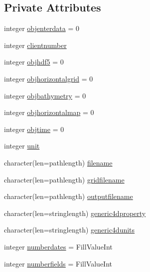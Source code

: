 \subsection*{Private Attributes}
\begin{DoxyCompactItemize}
\item 
integer \mbox{\hyperlink{structmoduleswan_1_1t__swan_ab28b32c787ffbe105db90cca3d7f8b81}{objenterdata}} = 0
\item 
integer \mbox{\hyperlink{structmoduleswan_1_1t__swan_aa430fc89c288d1393c57c9ebd5ec7ba4}{clientnumber}}
\item 
integer \mbox{\hyperlink{structmoduleswan_1_1t__swan_a33924ccabc1d330c49f9f284c1142565}{objhdf5}} = 0
\item 
integer \mbox{\hyperlink{structmoduleswan_1_1t__swan_a8254c93f48688777a4d4ca1329e1c001}{objhorizontalgrid}} = 0
\item 
integer \mbox{\hyperlink{structmoduleswan_1_1t__swan_acd8dd18615c9c5ba851bacf3c0865404}{objbathymetry}} = 0
\item 
integer \mbox{\hyperlink{structmoduleswan_1_1t__swan_accf3e22c8aefb44b7a2e3d97f78d31b5}{objhorizontalmap}} = 0
\item 
integer \mbox{\hyperlink{structmoduleswan_1_1t__swan_af98667131a0b35774d76eabc5ce1c240}{objtime}} = 0
\item 
integer \mbox{\hyperlink{structmoduleswan_1_1t__swan_a82a6af083dc416d9bc5473e7f219d88b}{unit}}
\item 
character(len=pathlength) \mbox{\hyperlink{structmoduleswan_1_1t__swan_ad315dd1323f0927838270e62f66a6375}{filename}}
\item 
character(len=pathlength) \mbox{\hyperlink{structmoduleswan_1_1t__swan_ad9e933b864e1a68825af56611882273c}{gridfilename}}
\item 
character(len=pathlength) \mbox{\hyperlink{structmoduleswan_1_1t__swan_a1e12c2c7e230f8f058fd9ff96fdc078c}{outputfilename}}
\item 
character(len=stringlength) \mbox{\hyperlink{structmoduleswan_1_1t__swan_aa0a6c27f69343a85826785cd4d19bcfd}{generic4dproperty}}
\item 
character(len=stringlength) \mbox{\hyperlink{structmoduleswan_1_1t__swan_ae5774ffe5361e500f3b8c3f4a9df2c87}{generic4dunits}}
\item 
integer \mbox{\hyperlink{structmoduleswan_1_1t__swan_ac78f0f870cfd6ed37c6ba7d13eb1e781}{numberdates}} = Fill\+Value\+Int
\item 
integer \mbox{\hyperlink{structmoduleswan_1_1t__swan_a27c4f52a63f3e553f707f587d26157aa}{numberfields}} = Fill\+Value\+Int

\end{DoxyCompactItemize}

